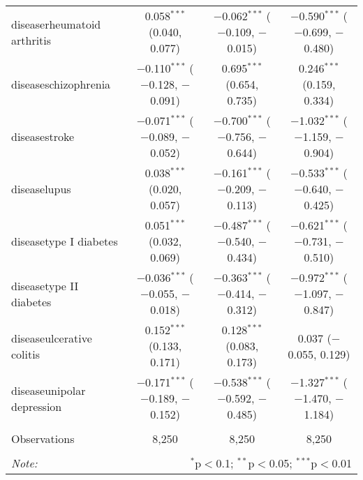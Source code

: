 \begin{table}[!htbp]
\begin{tabular}{@{\extracolsep{5pt}}lccc}
  diseaserheumatoid arthritis & 0.058$^{***}$ (0.040, 0.077) & $-$0.062$^{***}$ ($-$0.109, $-$0.015) & $-$0.590$^{***}$ ($-$0.699, $-$0.480) \\ 
  diseaseschizophrenia & $-$0.110$^{***}$ ($-$0.128, $-$0.091) & 0.695$^{***}$ (0.654, 0.735) & 0.246$^{***}$ (0.159, 0.334) \\ 
  diseasestroke & $-$0.071$^{***}$ ($-$0.089, $-$0.052) & $-$0.700$^{***}$ ($-$0.756, $-$0.644) & $-$1.032$^{***}$ ($-$1.159, $-$0.904) \\ 
  diseaselupus & 0.038$^{***}$ (0.020, 0.057) & $-$0.161$^{***}$ ($-$0.209, $-$0.113) & $-$0.533$^{***}$ ($-$0.640, $-$0.425) \\ 
  diseasetype I diabetes & 0.051$^{***}$ (0.032, 0.069) & $-$0.487$^{***}$ ($-$0.540, $-$0.434) & $-$0.621$^{***}$ ($-$0.731, $-$0.510) \\ 
  diseasetype II diabetes & $-$0.036$^{***}$ ($-$0.055, $-$0.018) & $-$0.363$^{***}$ ($-$0.414, $-$0.312) & $-$0.972$^{***}$ ($-$1.097, $-$0.847) \\ 
  diseaseulcerative colitis & 0.152$^{***}$ (0.133, 0.171) & 0.128$^{***}$ (0.083, 0.173) & 0.037 ($-$0.055, 0.129) \\ 
  diseaseunipolar depression & $-$0.171$^{***}$ ($-$0.189, $-$0.152) & $-$0.538$^{***}$ ($-$0.592, $-$0.485) & $-$1.327$^{***}$ ($-$1.470, $-$1.184) \\ 
 \hline \\[-1.8ex] 
Observations & 8,250 & 8,250 & 8,250 \\ 
\hline 
\hline \\[-1.8ex] 
\textit{Note:}  & \multicolumn{3}{r}{$^{*}$p$<$0.1; $^{**}$p$<$0.05; $^{***}$p$<$0.01} \\ 
\end{tabular} 
\end{table} 
